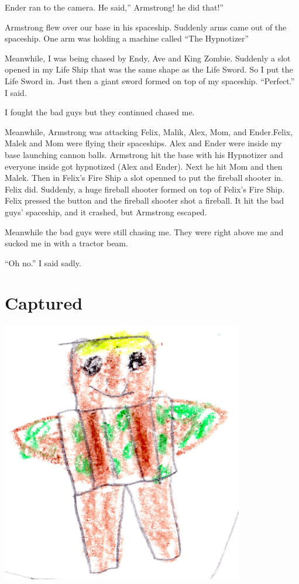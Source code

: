 \documentclass[booklet, twoside, 12pt]{krantz}
\begin{document}
Ender ran to the camera. He said,'' Armstrong! he did that!''

Armstrong flew over our base in his spaceship. Suddenly arms came out of
the spaceship. One arm was holding a machine called ``The Hypnotizer''

Meanwhile, I was being chased by Endy, Ave and King Zombie. Suddenly a
slot opened in my Life Ship that was the same shape as the Life Sword.
So I put the Life Sword in. Just then a giant sword formed on top of my
spaceship. ``Perfect.'' I said.

I fought the bad guys but they continued chased me.

Meanwhile, Armstrong was attacking Felix, Malik, Alex, Mom, and
Ender.Felix, Malek and Mom were flying their spaceships. Alex and Ender
were inside my base launching cannon balls. Armstrong hit the base with
his Hypnotizer and everyone inside got hypnotized (Alex and Ender). Next
he hit Mom and then Malek. Then in Felix's Fire Ship a slot openned to
put the fireball shooter in. Felix did. Suddenly, a huge fireball
shooter formed on top of Felix's Fire Ship. Felix pressed the button and
the fireball shooter shot a fireball. It hit the bad guys' spaceship,
and it crashed, but Armstrong escaped.

Meanwhile the bad guys were still chasing me. They were right above me
and sucked me in with a tractor beam.

``Oh no.'' I said sadly.

\hypertarget{captured}{%
\section{Captured}\label{captured}}

\includegraphics[width=4.16667in,height=\textheight]{img/four-bad-guys/lifegod.jpg}
\end{document}
